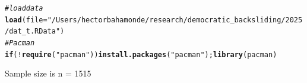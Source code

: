 \documentclass{article}\usepackage[]{graphicx}\usepackage[]{xcolor}
\makeatletter
\newcommand{\hlsng}[1]{\textcolor[rgb]{0.192,0.494,0.8}{#1}}%
\newcommand{\hlcom}[1]{\textcolor[rgb]{0.678,0.584,0.686}{\textit{#1}}}%
\newcommand{\hlopt}[1]{\textcolor[rgb]{0,0,0}{#1}}%
\newcommand{\hldef}[1]{\textcolor[rgb]{0.345,0.345,0.345}{#1}}%
\newcommand{\hlkwa}[1]{\textcolor[rgb]{0.161,0.373,0.58}{\textbf{#1}}}%
\newcommand{\hlkwc}[1]{\textcolor[rgb]{0.333,0.667,0.333}{#1}}%
\newcommand{\hlkwd}[1]{\textcolor[rgb]{0.737,0.353,0.396}{\textbf{#1}}}%
\newenvironment{kframe}{%
 \def\at@end@of@kframe{}%
 \ifinner\ifhmode%
  \def\at@end@of@kframe{\end{minipage}}%
  \begin{minipage}{\columnwidth}%
 \fi\fi%
 \def\FrameCommand##1{\hskip\@totalleftmargin \hskip-\fboxsep
 \colorbox{shadecolor}{##1}\hskip-\fboxsep
     \hskip-\linewidth \hskip-\@totalleftmargin \hskip\columnwidth}%
 \MakeFramed {\advance\hsize-\width
   \@totalleftmargin\z@ \linewidth\hsize
   \@setminipage}}%
 {\par\unskip\endMakeFramed%
 \at@end@of@kframe}
\newenvironment{knitrout}{}{} %
\makeatother
\begin{document}
\begin{knitrout}
\color{fgcolor}\begin{kframe}
\begin{alltt}
\hlcom{# load data}
\hlkwd{load}\hldef{(}\hlkwc{file}\hldef{=}\hlsng{"/Users/hectorbahamonde/research/democratic_backsliding/2025/dat_t.RData"}\hldef{)}
\hlcom{# Pacman}
\hlkwa{if} \hldef{(}\hlopt{!}\hlkwd{require}\hldef{(}\hlsng{"pacman"}\hldef{))} \hlkwd{install.packages}\hldef{(}\hlsng{"pacman"}\hldef{);} \hlkwd{library}\hldef{(pacman)}
\end{alltt}


{\ttfamily\noindent\itshape\color{messagecolor}{\#\# Loading required package: pacman}}\end{kframe}
\end{knitrout}

Sample size is n = 1515
\end{document}
